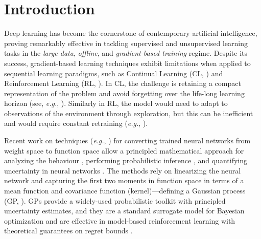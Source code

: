 \documentclass{article}
\makeatletter
\newcommand{\eg}{\textit{e.g.\@}\xspace}
\makeatother
\begin{document}

\section{Introduction}
\label{sec:intro}
%
Deep learning has become the cornerstone of contemporary artificial intelligence, proving remarkably effective in tackling supervised and unsupervised learning tasks in the {\em large data}, {\em offline}, and {\em gradient-based training} regime. Despite its success, gradient-based learning techniques exhibit limitations when applied to sequential learning paradigms, such as Continual Learning (CL, \cite{add}) and Reinforcement Learning (RL, \cite{add}). In CL, the challenge is retaining a compact representation of the problem and avoid forgetting over the life-long learning horizon (see, \eg, \cite{add}). Similarly in RL, the model would need to adapt to observations of the environment through exploration, but this can be inefficient and would require constant retraining (\eg, \cite{add, add}).

Recent work on techniques (\eg, \cite{list}) for converting trained neural networks from weight space to function space allow a principled mathematical approach for analyzing the behaviour \cite{add}, performing probabilistic inference \cite{add}, and quantifying uncertainty in neural networks \cite{add}. The methods rely on linearizing the neural network and capturing the first two moments in function space in terms of a mean function and covariance function (kernel)---defining a Gaussian process (GP, \cite{rasmussen2006}). GPs provide a widely-used probabilistic toolkit with principled uncertainty estimates, and they are a standard surrogate model for Bayesian optimization \citep{garnett_bayesoptbook_2022} and are effective in model-based reinforcement learning \citep{deisenroth2011pilco} with theoretical guarantees on regret bounds \citep{srinivas2009gaussian}. 
\end{document}

